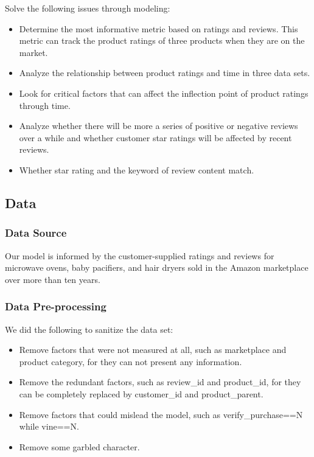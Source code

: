 \documentclass{mcmthesis}
\begin{document}
Solve the following issues through modeling:
\begin{itemize}
  \item Determine the most informative metric based on ratings and reviews. This metric can track the product ratings of three products when they are on the market.
  
  \item Analyze the relationship between product ratings and time in three data sets.
  
  \item Look for critical factors that can affect the inflection point of product ratings through time.
  
  \item Analyze whether there will be more a series of positive or negative reviews over a while and whether customer star ratings will be affected by recent reviews.
  
  \item Whether star rating and the keyword of review content match.
\end{itemize}

\subsection{ Data }
\subsubsection{Data Source}
Our model is informed by the customer-supplied ratings and reviews for microwave ovens, baby pacifiers, and hair dryers sold in the Amazon marketplace over more than ten years.
\subsubsection{Data Pre-processing}
We did the following to sanitize the data set:
\begin{itemize}
  \item Remove factors that were not measured at all, such as marketplace and product category, for they can not present any information.
  
  \item Remove the redundant factors, such as review\_id and product\_id, for they can be completely replaced by customer\_id and product\_parent.
  
  \item Remove factors that could mislead the model, such as verify\_purchase==N while vine==N.
  
  \item Remove some garbled character.
\end{itemize}
\end{document}
